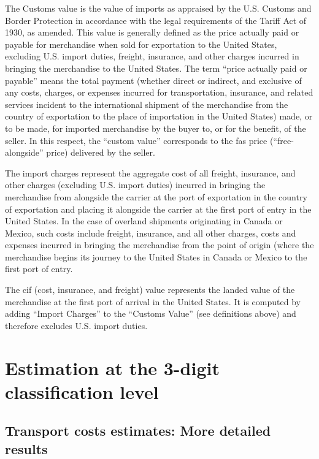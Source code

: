 \documentclass[a4paper,11pt]{article}
\begin{document}
The Customs value is the value of imports as appraised by the U.S. Customs and Border Protection in accordance with the legal requirements of the Tariff Act of 1930, as amended. This value is generally defined as the price actually paid or payable for merchandise when sold for exportation to the United States, excluding U.S. import duties, freight, insurance, and other charges incurred in bringing the merchandise to the United States. The term ``price actually paid or payable'' means the total payment (whether direct or indirect, and exclusive of any costs, charges, or expenses incurred for transportation, insurance, and related services incident to the international shipment of the merchandise from the country of exportation to the place of importation in the United States) made, or to be made, for imported merchandise by the buyer to, or for the benefit, of the seller. In this respect, the ``custom value'' corresponds to the fas price (``free-alongside'' price) delivered by the seller.

The import charges represent the aggregate cost of all freight, insurance, and other charges (excluding U.S. import duties) incurred in bringing the merchandise from alongside the carrier at the port of exportation in the country of exportation and placing it alongside the carrier at the first port of entry in the United States. In the case of overland shipments originating in Canada or Mexico, such costs include freight, insurance, and all other charges, costs and expenses incurred in bringing the merchandise from the point of origin (where the merchandise begins its journey to the United States in Canada or Mexico to the first port of entry.

The cif (cost, insurance, and freight) value represents the landed value of the merchandise at the first port of arrival in the United States. It is computed by adding ``Import Charges'' to the ``Customs Value'' (see definitions above) and therefore excludes U.S. import duties.

\section{Estimation at the 3-digit classification level \label{app:more_results}}

\subsection{Transport costs estimates: More detailed results}
\end{document}
